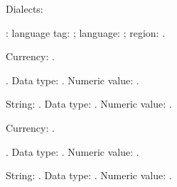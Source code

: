 \documentclass{article}
\begin{document}
Dialects:
\ForEachTrackedDialect\thisdialect
{
\par
\thisdialect:
language tag: \GetTrackedLanguageTag{\thisdialect};
language: \TrackedLanguageFromDialect{\thisdialect};
region: \TrackedIsoCodeFromLanguage{\TwoLetterIsoCountryCode}{\thisdialect}.
 }

Currency: \result.

\DTLparse{}\result.
Data type: \DTLgetDataTypeName{\DTLdatumtype{\result}}.
Numeric value: \DTLdatumvalue{\result}.

\DTLparse{}
String: \result.
Data type: \DTLgetDataTypeName{\DTLdatumtype{\result}}.
Numeric value: \DTLdatumvalue{\result}.


Currency: \result.

\DTLparse{}\result.
Data type: \DTLgetDataTypeName{\DTLdatumtype{\result}}.
Numeric value: \DTLdatumvalue{\result}.

\DTLparse{}
String: \result.
Data type: \DTLgetDataTypeName{\DTLdatumtype{\result}}.
Numeric value: \DTLdatumvalue{\result}.
\end{document}
